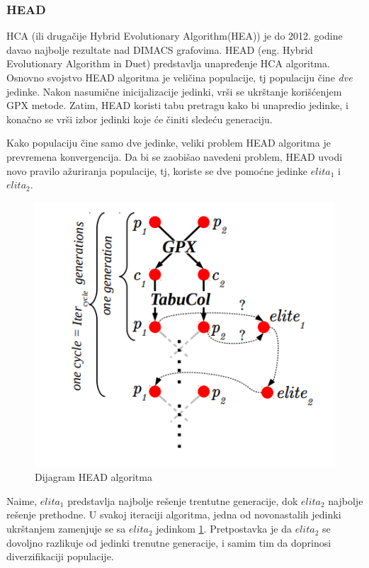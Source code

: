 \documentclass[a4paper]{article}
\begin{document}
\subsubsection{HEAD}
HCA (ili drugačije Hybrid Evolutionary Algorithm(HEA)) je do 2012. godine davao najbolje rezultate nad DIMACS \cite{10.5555/548182} grafovima. HEAD (eng. Hybrid Evolutionary Algorithm in Duet) \cite{moalic2018variations} predstavlja unapređenje HCA algoritma. Osnovno svojstvo HEAD algoritma je veličina populacije, tj populaciju čine \textit{dve} jedinke. Nakon nasumične inicijalizacije jedinki, vrši se ukrštanje korišćenjem GPX metode. Zatim, HEAD koristi tabu pretragu kako bi unapredio jedinke, i konačno se vrši izbor jedinki koje će činiti sledeću generaciju. 

Kako populaciju čine samo dve jedinke, veliki problem HEAD algoritma je prevremena konvergencija. Da bi se zaobišao navedeni problem, HEAD uvodi novo pravilo ažuriranja populacije, tj, koriste se dve pomoćne jedinke $elita_1$ i $elita_2$.

\begin{figure}[h!]
\centering
\includegraphics[scale=0.5]{head_algoritam}
\caption{Dijagram HEAD algoritma}
\label{head_algoritam}
\end{figure}

Naime, $elita_1$ predstavlja najbolje rešenje trentutne generacije, dok $elita_2$ najbolje rešenje prethodne. U svakoj iteraciji algoritma, jedna od novonastalih jedinki ukrštanjem zamenjuje se sa $elita_2$ jedinkom \ref{head_algoritam}. Pretpostavka je da $elita_2$ se dovoljno razlikuje od jedinki trenutne generacije, i samim tim da doprinosi diverzifikaciji populacije.
\end{document}

